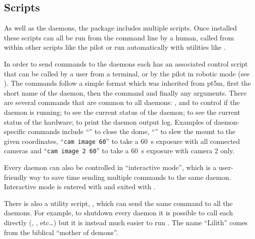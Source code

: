 \begin{colsection}
\begin{colsection}
\end{colsection}


\subsection{Scripts}
\label{sec:scripts}
\begin{colsection}

As well as the daemons, the  package includes multiple  scripts. Once installed these scripts can all be run from the command line by a human, called from within other scripts like the pilot or run automatically with utilities like .

In order to send commands to the daemons each has an associated control script that can be called by a user from a terminal, or by the pilot in robotic mode (see ). The commands follow a simple format which was inherited from \gls{pt5m}, first the short name of the daemon, then the command and finally any arguments. There are several commands that are common to all daemons: ,  and  to control if the daemon is running;  to see the current status of the daemon;  to see the current status of the hardware;  to print the daemon output log. Examples of daemon-specific commands include ``'' to close the dome, ``'' to slew the mount to the given coordinates, ``\texttt{cam~image~60}'' to take a \SI{60}{\second} exposure with all connected cameras and ``\texttt{cam~image~2~60}'' to take a \SI{60}{\second} exposure with camera 2 only.

Every daemon can also be controlled in ``interactive mode'', which is a user-friendly way to save time sending multiple commands to the same daemon. Interactive mode is entered with  and exited with .

There is also a utility script, , which can send the same command to all the daemons. For example, to shutdown every daemon it is possible to call each directly (, ,  etc\ldots) but it is instead much easier to run . The name ``Lilith'' comes from the biblical ``mother of demons''.


\end{colsection}
\end{colsection}

